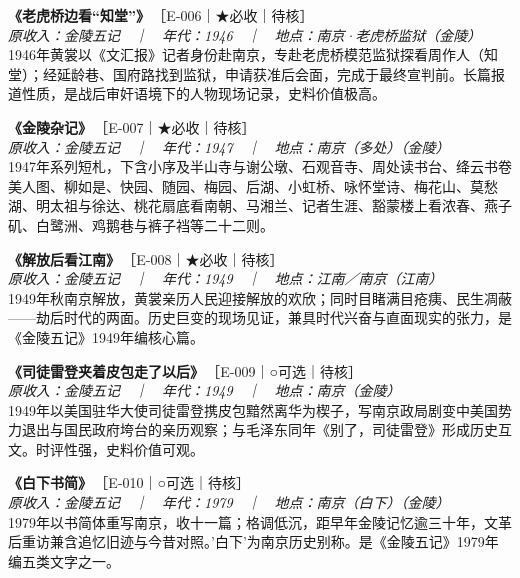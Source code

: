 \documentclass[UTF8,fontset=none,zihao=-4,a4paper]{ctexart}
\begin{document}
\noindent\textbf{《老虎桥边看“知堂”》}\,{\small ［E-006｜★必收｜待核］}\\
{\small\itshape 原收入：金陵五记　｜　年代：1946　｜　地点：南京·老虎桥监狱（金陵）}\\
1946年黄裳以《文汇报》记者身份赴南京，专赴老虎桥模范监狱探看周作人（知堂）；经延龄巷、国府路找到监狱，申请获准后会面，完成于最终宣判前。长篇报道性质，是战后审奸语境下的人物现场记录，史料价值极高。
\par\vspace{5pt}
\noindent\textbf{《金陵杂记》}\,{\small ［E-007｜★必收｜待核］}\\
{\small\itshape 原收入：金陵五记　｜　年代：1947　｜　地点：南京（多处）（金陵）}\\
1947年系列短札，下含小序及半山寺与谢公墩、石观音寺、周处读书台、绛云书卷美人图、柳如是、快园、随园、梅园、后湖、小虹桥、咏怀堂诗、梅花山、莫愁湖、明太祖与徐达、桃花扇底看南朝、马湘兰、记者生涯、豁蒙楼上看浓春、燕子矶、白鹭洲、鸡鹅巷与裤子裆等二十二则。
\par\vspace{5pt}
\noindent\textbf{《解放后看江南》}\,{\small ［E-008｜★必收｜待核］}\\
{\small\itshape 原收入：金陵五记　｜　年代：1949　｜　地点：江南／南京（江南）}\\
1949年秋南京解放，黄裳亲历人民迎接解放的欢欣；同时目睹满目疮痍、民生凋蔽——劫后时代的两面。历史巨变的现场见证，兼具时代兴奋与直面现实的张力，是《金陵五记》1949年编核心篇。
\par\vspace{5pt}
\noindent\textbf{《司徒雷登夹着皮包走了以后》}\,{\small ［E-009｜○可选｜待核］}\\
{\small\itshape 原收入：金陵五记　｜　年代：1949　｜　地点：南京（金陵）}\\
1949年以美国驻华大使司徒雷登携皮包黯然离华为楔子，写南京政局剧变中美国势力退出与国民政府垮台的亲历观察；与毛泽东同年《别了，司徒雷登》形成历史互文。时评性强，史料价值可观。
\par\vspace{5pt}
\noindent\textbf{《白下书简》}\,{\small ［E-010｜○可选｜待核］}\\
{\small\itshape 原收入：金陵五记　｜　年代：1979　｜　地点：南京（白下）（金陵）}\\
1979年以书简体重写南京，收十一篇；格调低沉，距早年金陵记忆逾三十年，文革后重访兼含追忆旧迹与今昔对照。'白下'为南京历史别称。是《金陵五记》1979年编五类文字之一。
\par\vspace{5pt}
\end{document}
